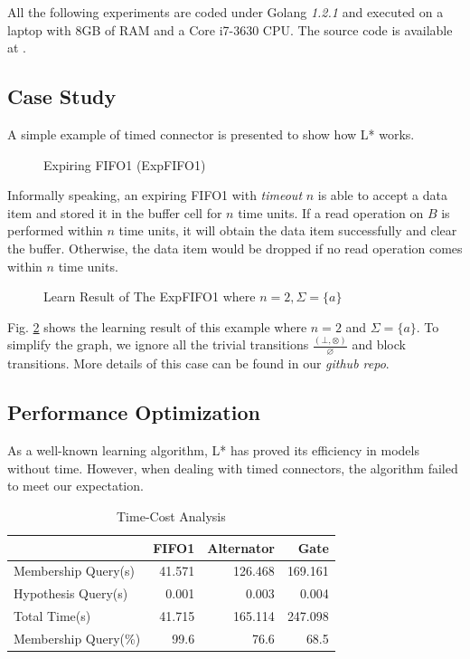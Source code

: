 \documentclass[conference, a4paper]{IEEEtran}
\newcommand{\rnoread}[0]{\otimes}
\newcommand{\rempty}[0]{\varnothing}
\begin{document}
All the following experiments are coded under Golang \emph{1.2.1} and executed on a laptop with 8GB
of RAM and a Core i7-3630 CPU. The source code is available at \cite{reo-learn-github}.

\subsection{Case Study}
A simple example of timed connector is presented to show how L* works.
\begin{figure}[ht]
  \begin{center}
    
  \end{center}
  \caption{Expiring FIFO1 (ExpFIFO1)}
  \label{fig:expfifo}
\end{figure}

Informally speaking, an expiring FIFO1 with \emph{timeout} $n$ is able to accept a data item
and stored it in the buffer cell for $n$ time units. If a read operation on $B$ is performed within
$n$ time units, it will obtain the data item successfully and clear the buffer. Otherwise, the data
item would be dropped if no read operation comes within $n$ time units.

\begin{figure}[ht]
  \begin{center}
    
  \end{center}
  \caption{Learn Result of The ExpFIFO1 where $n=2,\Sigma=\{a\}$}
  \label{fig:expfifosemantics}
\end{figure}

Fig. \ref{fig:expfifosemantics} shows the learning result of this example where $n=2$ and
$\Sigma=\{a\}$.
To simplify the graph, we ignore all the trivial transitions $\frac{(\bot,\rnoread)}{\rempty}$
and block transitions. More details of this case can be found in our \emph{github repo}.

\subsection{Performance Optimization}
As a well-known learning algorithm, L* has proved its efficiency in models without time.
However, when dealing with timed connectors, the algorithm failed to meet our expectation.

\begin{table}[ht]
  \renewcommand{\arraystretch}{1.3}
  \caption{Time-Cost Analysis}
  \label{tabel:timecost}
  \centering
  \begin{tabular}{l||rrr}
    \hline
    & FIFO1 & Alternator & Gate \\
    \hline\hline
    Membership Query(s) & 41.571 & 126.468 & 169.161 \\
    Hypothesis Query(s) & 0.001 & 0.003 & 0.004 \\
    Total Time(s) & 41.715 & 165.114 & 247.098 \\
    Membership Query(\%) & 99.6 & 76.6 & 68.5 \\
    \hline
  \end{tabular}
\end{table}
\end{document}
